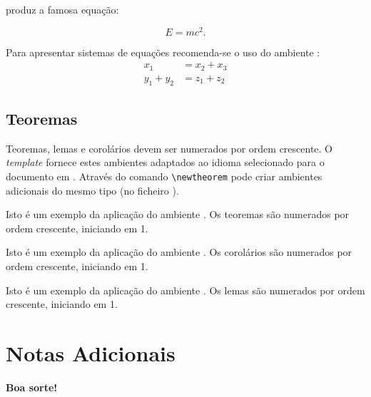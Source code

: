 \noindent produz a famosa equação:

\begin{equation}
E = mc^{2} .
\label{eqn:einstein}
\end{equation}

Para apresentar sistemas de equações recomenda-se o uso do ambiente :
\begin{align}
	x_1 &= x_2 + x_3\\
	y_1 + y_2 &= z_1 + z_2
	\label{eqn:eq2}
\end{align}  


\subsection{Teoremas}

Teoremas, lemas e corolários devem ser numerados por ordem crescente. O \textit{template} fornece estes ambientes adaptados ao idioma selecionado para o documento em . Através do comando \verb|\newtheorem| pode criar ambientes adicionais do mesmo tipo (no ficheiro ). 

\begin{theorem}
Isto é um exemplo da aplicação do ambiente . Os teoremas são numerados por ordem crescente, iniciando em 1.
\end{theorem}

\begin{corollary}
Isto é um exemplo da aplicação do ambiente . Os corolários são numerados por ordem crescente, iniciando em 1.
\end{corollary}

\begin{lemma}
Isto é um exemplo da aplicação do ambiente . Os lemas são numerados por ordem crescente, iniciando em 1.
\end{lemma}

\section{Notas Adicionais}

\textbf{Boa sorte!}

